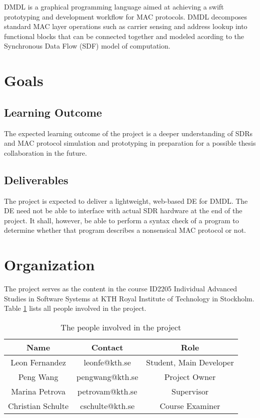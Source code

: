 \documentclass[12pt,twoside]{article}
\begin{document}
DMDL \cite{dmdl} is a graphical programming language aimed at achieving a swift prototyping and
development workflow for MAC protocols. DMDL decomposes standard MAC layer operations such as carrier sensing and address lookup into functional blocks
that can be connected together and modeled acording to the Synchronous Data Flow (SDF) model of computation.

\section{Goals}
\label{sec:goals}

\subsection{Learning Outcome}
The expected learning outcome of the project is a deeper understanding of SDRs and MAC protocol simulation and prototyping in
preparation for a possible thesis collaboration in the future.

\subsection{Deliverables}
The project is expected to deliver a lightweight, web-based DE for DMDL. The DE need not
be able to interface with actual SDR hardware at the end of the project. It shall, however, be able to perform a syntax check
of a program to determine whether that program describes a nonsensical MAC protocol or not.


\section{Organization}
\label{sec:organization}

The project serves as the content in the course ID2205 Individual Advanced Studies in Software Systems at KTH Royal Institute of Technology in Stockholm. 
Table \ref{tab:people} lists all people involved in the project.
\begin{table}[!h]
\renewcommand{\arraystretch}{1.3}
\caption{The people involved in the project}
\label{tab:people}
\centering
\begin{tabular}{|c|c|c|}
\hline
\textbf{Name} & \textbf{Contact} & \textbf{Role}\\
\hline
Leon Fernandez & leonfe@kth.se & Student, Main Developer\\
\hline
Peng Wang & pengwang@kth.se & Project Owner\\
\hline
Marina Petrova & petrovam@kth.se & Supervisor\\
\hline
Christian Schulte & cschulte@kth.se & Course Examiner\\
\hline
\end{tabular}
\end{table}
\end{document}
